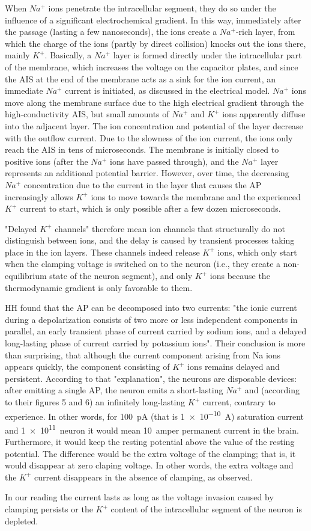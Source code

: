 When $Na^+$ ions penetrate the intracellular segment, they do so under the influence of a significant electrochemical gradient. In this way, immediately after the passage (lasting a few nanoseconds), the ions create a $Na^+$-rich layer, from which the charge of the ions (partly by direct collision) knocks out the ions there, mainly $K^+$.
Basically, a $Na^+$ layer is formed directly under the intracellular part of the membrane, which increases the voltage on the capacitor plates, and since the \gls{AIS} at the end of the membrane acts as a sink for the ion current, an immediate $Na^+$ current is initiated, as discussed in the electrical model.
$Na^+$ ions move along the membrane surface due to the high electrical gradient through the high-conductivity \gls{AIS}, but small amounts of $Na^+$ and $K^+$ ions apparently diffuse into the adjacent layer. The ion concentration and potential of the layer decrease with the outflow current. Due to the slowness of the ion current, the ions only reach the \gls{AIS} in tens of microseconds.
The membrane is initially closed to positive ions (after the $Na^+$ ions have passed through), and the $Na^+$ layer represents an additional potential barrier. However, over time, the decreasing $Na^+$ concentration due to the current in the layer that causes the \gls{AP} increasingly allows $K^+$ ions to move towards the membrane and the experienced $K^+$ current to start, which is only possible after a few dozen microseconds.

"Delayed $K^+$ channels" therefore mean ion channels that structurally do not distinguish between ions, and the delay is caused by transient processes taking place in the ion layers. These channels indeed release $K^+$ ions, which only start when the clamping voltage is switched on to the neuron (i.e., they create a non-equilibrium state of the neuron segment), and only $K^+$ ions because the thermodynamic gradient is only favorable to them.

\gls{HH} found that the \gls{AP} can be decomposed into two currents:
"the ionic current during a depolarization consists of two more or less independent components in parallel, an early transient phase of current carried by sodium ions, and a delayed long-lasting phase of current carried by potassium ions".
Their conclusion is more than surprising, that although the current component arising from Na ions appears quickly, the component consisting of $K^+$ ions remains delayed and persistent. According to that "explanation", the neurons are disposable devices: after emitting a single \gls{AP}, the neuron emits a short-lasting $Na^+$ and (according to their figures 5 and 6) an infinitely long-lasting $K^+$ current, contrary to experience.
In other words, for \SI{100}{\pico\ampere} (that is \SI{1e-10}{\ampere}) saturation current and \SI{1e11}{neuron} it would mean
10~amper permanent current in the brain.
Furthermore, it would keep the resting potential above 
the value of the resting potential. The difference 
would be the extra voltage of the clamping; that is,
it would disappear at zero claping voltage.
In other words, the extra voltage and the  $K^+$ current disappears in the absence of clamping, as observed.

In our reading the current lasts as long as the voltage invasion caused by clamping persists or the $K^+$ content of the intracellular segment of the neuron is depleted.


